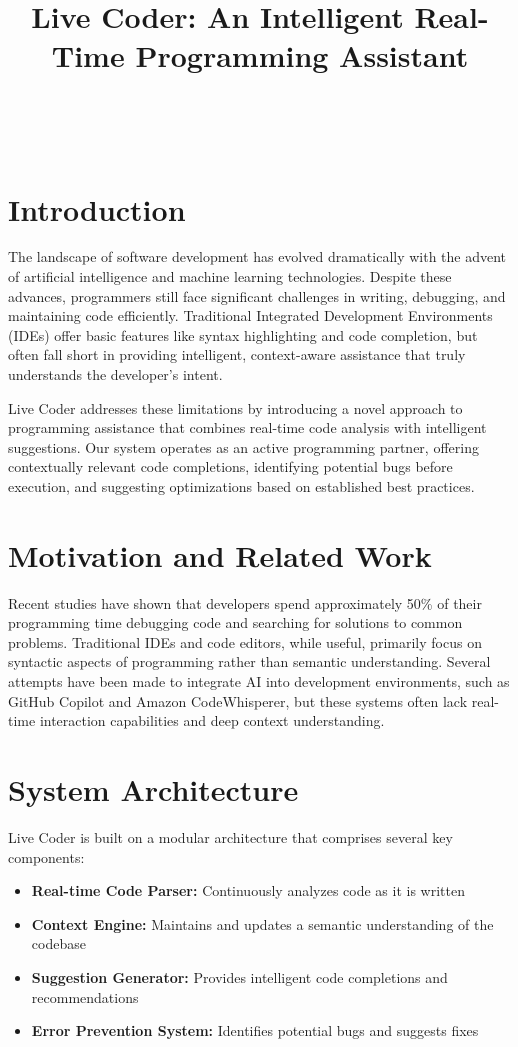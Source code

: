 \documentclass{lxaiproposal}
\title{Live Coder: An Intelligent Real-Time Programming Assistant}
\author{\coord{a}{b}{1} \\
       \coord{c}{d}{1} \\
       }
\begin{document}
\maketitle

\section{Introduction}
The landscape of software development has evolved dramatically with the advent of artificial intelligence and machine learning technologies. Despite these advances, programmers still face significant challenges in writing, debugging, and maintaining code efficiently. Traditional Integrated Development Environments (IDEs) offer basic features like syntax highlighting and code completion, but often fall short in providing intelligent, context-aware assistance that truly understands the developer's intent.

Live Coder addresses these limitations by introducing a novel approach to programming assistance that combines real-time code analysis with intelligent suggestions. Our system operates as an active programming partner, offering contextually relevant code completions, identifying potential bugs before execution, and suggesting optimizations based on established best practices.

\section{Motivation and Related Work}
Recent studies have shown that developers spend approximately 50\% of their programming time debugging code and searching for solutions to common problems. Traditional IDEs and code editors, while useful, primarily focus on syntactic aspects of programming rather than semantic understanding. Several attempts have been made to integrate AI into development environments, such as GitHub Copilot and Amazon CodeWhisperer, but these systems often lack real-time interaction capabilities and deep context understanding.

\section{System Architecture}
Live Coder is built on a modular architecture that comprises several key components:

\begin{itemize}
    \item \textbf{Real-time Code Parser:} Continuously analyzes code as it is written
    \item \textbf{Context Engine:} Maintains and updates a semantic understanding of the codebase
    \item \textbf{Suggestion Generator:} Provides intelligent code completions and recommendations
    \item \textbf{Error Prevention System:} Identifies potential bugs and suggests fixes
\end{itemize}
\end{document}
